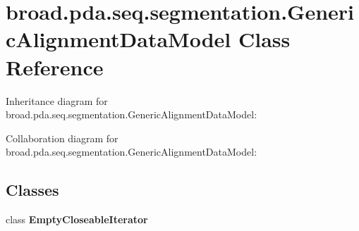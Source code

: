 \hypertarget{classbroad_1_1pda_1_1seq_1_1segmentation_1_1_generic_alignment_data_model}{\section{broad.\+pda.\+seq.\+segmentation.\+Generic\+Alignment\+Data\+Model Class Reference}
\label{classbroad_1_1pda_1_1seq_1_1segmentation_1_1_generic_alignment_data_model}
}


Inheritance diagram for broad.\+pda.\+seq.\+segmentation.\+Generic\+Alignment\+Data\+Model\+:


Collaboration diagram for broad.\+pda.\+seq.\+segmentation.\+Generic\+Alignment\+Data\+Model\+:
\subsection*{Classes}
\begin{DoxyCompactItemize}
\item 
class {\bfseries Empty\+Closeable\+Iterator}
\end{DoxyCompactItemize}
